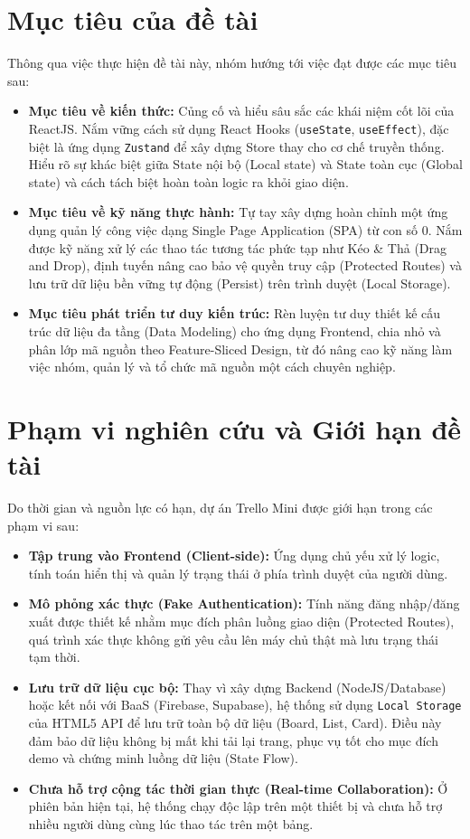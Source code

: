 \section{Mục tiêu của đề tài}
Thông qua việc thực hiện đề tài này, nhóm hướng tới việc đạt được các mục tiêu sau:
\begin{itemize}
    \item \textbf{Mục tiêu về kiến thức:} Củng cố và hiểu sâu sắc các khái niệm cốt lõi của ReactJS. Nắm vững cách sử dụng React Hooks (\texttt{useState}, \texttt{useEffect}), đặc biệt là ứng dụng \texttt{Zustand} để xây dựng Store thay cho cơ chế truyền thống. Hiểu rõ sự khác biệt giữa State nội bộ (Local state) và State toàn cục (Global state) và cách tách biệt hoàn toàn logic ra khỏi giao diện.
    \item \textbf{Mục tiêu về kỹ năng thực hành:} Tự tay xây dựng hoàn chỉnh một ứng dụng quản lý công việc dạng Single Page Application (SPA) từ con số 0. Nắm được kỹ năng xử lý các thao tác tương tác phức tạp như Kéo \& Thả (Drag and Drop), định tuyến nâng cao bảo vệ quyền truy cập (Protected Routes) và lưu trữ dữ liệu bền vững tự động (Persist) trên trình duyệt (Local Storage).
    \item \textbf{Mục tiêu phát triển tư duy kiến trúc:} Rèn luyện tư duy thiết kế cấu trúc dữ liệu đa tầng (Data Modeling) cho ứng dụng Frontend, chia nhỏ và phân lớp mã nguồn theo Feature-Sliced Design, từ đó nâng cao kỹ năng làm việc nhóm, quản lý và tổ chức mã nguồn một cách chuyên nghiệp.
\end{itemize}

\section{Phạm vi nghiên cứu và Giới hạn đề tài}
Do thời gian và nguồn lực có hạn, dự án Trello Mini được giới hạn trong các phạm vi sau:
\begin{itemize}
    \item \textbf{Tập trung vào Frontend (Client-side):} Ứng dụng chủ yếu xử lý logic, tính toán hiển thị và quản lý trạng thái ở phía trình duyệt của người dùng.
    \item \textbf{Mô phỏng xác thực (Fake Authentication):} Tính năng đăng nhập/đăng xuất được thiết kế nhằm mục đích phân luồng giao diện (Protected Routes), quá trình xác thực không gửi yêu cầu lên máy chủ thật mà lưu trạng thái tạm thời.
    \item \textbf{Lưu trữ dữ liệu cục bộ:} Thay vì xây dựng Backend (NodeJS/Database) hoặc kết nối với BaaS (Firebase, Supabase), hệ thống sử dụng \texttt{Local Storage} của HTML5 API để lưu trữ toàn bộ dữ liệu (Board, List, Card). Điều này đảm bảo dữ liệu không bị mất khi tải lại trang, phục vụ tốt cho mục đích demo và chứng minh luồng dữ liệu (State Flow).
    \item \textbf{Chưa hỗ trợ cộng tác thời gian thực (Real-time Collaboration):} Ở phiên bản hiện tại, hệ thống chạy độc lập trên một thiết bị và chưa hỗ trợ nhiều người dùng cùng lúc thao tác trên một bảng.
\end{itemize}

